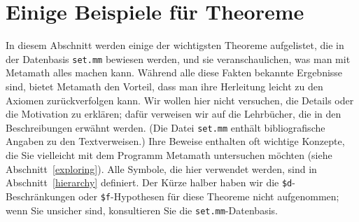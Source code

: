 
\section{Einige Beispiele für Theoreme}\label{sometheorems}

In diesem Abschnitt werden einige der wichtigsten Theoreme aufgelistet, die in der Datenbasis \texttt{set.mm} bewiesen werden, und sie veranschaulichen, was man mit Metamath alles machen kann.  Während alle diese Fakten bekannte Ergebnisse sind, bietet Metamath den Vorteil, dass man ihre Herleitung leicht zu den Axiomen zurückverfolgen kann.  Wir wollen hier nicht versuchen, die Details oder die Motivation zu erklären; dafür verweisen wir auf die Lehrbücher, die in den Beschreibungen erwähnt werden.  (Die Datei \texttt{set.mm} enthält bibliografische Angaben zu den Textverweisen.)  Ihre Beweise enthalten oft wichtige Konzepte, die Sie vielleicht mit dem Programm Metamath untersuchen möchten (siehe Abschnitt~\ref{exploring}).  Alle Symbole, die hier verwendet werden, sind in Abschnitt~\ref{hierarchy} definiert.  Der Kürze halber haben wir die \texttt{\$d}-Beschränkungen oder \texttt{\$f}-Hypothesen für diese Theoreme nicht aufgenommen; wenn Sie unsicher sind, konsultieren Sie die \texttt{set.mm}-Datenbasis.

